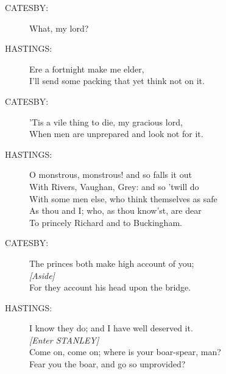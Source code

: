 \documentclass{article}
\begin{document}
\begin{description}
\item[CATESBY:] 
\hspace{1pt}What, my lord?\\
\end{description}
\begin{description}
\item[HASTINGS:] 
\hspace{1pt}Ere a fortnight make me elder,\\
\hspace{1pt}I'll send some packing that yet think not on it.\\
\end{description}
\begin{description}
\item[CATESBY:] 
\hspace{1pt}'Tis a vile thing to die, my gracious lord,\\
\hspace{1pt}When men are unprepared and look not for it.\\
\end{description}
\begin{description}
\item[HASTINGS:] 
\hspace{1pt}O monstrous, monstrous! and so falls it out\\
\hspace{1pt}With Rivers, Vaughan, Grey: and so 'twill do\\
\hspace{1pt}With some men else, who think themselves as safe\\
\hspace{1pt}As thou and I; who, as thou know'st, are dear\\
\hspace{1pt}To princely Richard and to Buckingham.\\
\end{description}
\begin{description}
\item[CATESBY:] 
\hspace{1pt}The princes both make high account of you;\\
{\it [Aside]}\\
\hspace{1pt}For they account his head upon the bridge.\\
\end{description}
\begin{description}
\item[HASTINGS:] 
\hspace{1pt}I know they do; and I have well deserved it.\\
{\it [Enter STANLEY]}\\
\hspace{1pt}Come on, come on; where is your boar-spear, man?\\
\hspace{1pt}Fear you the boar, and go so unprovided?\\
\end{description}
\end{document}
